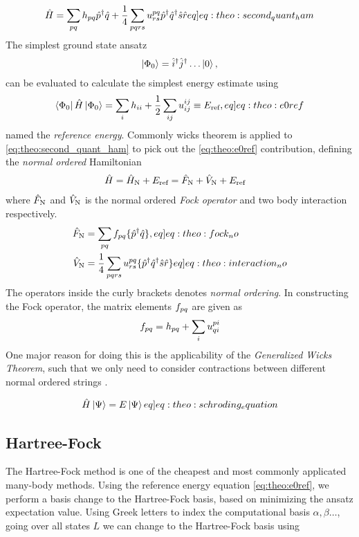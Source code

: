 \begin{align}
    \ham = \sum_{pq} \hshort{p}{q}\crt{p}\ani{q} + \frac{1}{4} \sum_{pqrs} \elmASshort{pq}{rs}\crt{p}\crt{q}\ani{s}\ani{r} \label[eq]{eq:theo:second_quant_ham}
\end{align}
The simplest ground state ansatz
\begin{align*}
    \ket{\Phi_0} = \hat{i}^{\dagger}\hat{j}^{\dagger}\ldots \ket{0},
\end{align*}
can be evaluated to calculate the simplest energy estimate using  \citep{molinariNotesWickTheorem2017} 
\begin{align}
    \braansatz \ham \ketansatz = \sum_{i} \hshort{i}{i} + \frac{1}{2}\sum_{ij} \elmASshort{ij}{ij} \equiv \Eref, \label[eq]{eq:theo:e0ref}
\end{align}
named the \textit{reference energy}. Commonly wicks theorem is applied to \cref{eq:theo:second_quant_ham} to pick out the \cref{eq:theo:e0ref} contribution, defining the \textit{normal ordered} Hamiltonian
\begin{align*}
    \hat{H} &= \hat{H}_\text{N} + E_{\text{ref}} = \hat{F}_\text{N} + \hat{V}_\text{N} + E_{\text{ref}}
\end{align*}
where $\hat{F}_\text{N}$ and $\hat{V}_\text{N}$ is the normal ordered \textit{Fock operator} and two body interaction respectively.
\begin{align}
    \fockno &= \sum_{pq} \fshort{p}{q} \set{\crt{p} \ani{q}}, \label[eq]{eq:theo:fock_no} \\
    \interno &= \frac{1}{4}\sum_{pqrs} \elmASshort{pq}{rs} \set{\crt{p}\crt{q}\ani{s}\ani{r}} \label[eq]{eq:theo:interaction_no}
\end{align}
The operators inside the curly brackets denotes \textit{normal ordering}. In constructing the Fock operator, the matrix elements $f_{pq}$ are given as 
\begin{align*}
    f_{pq} = h_{pq} + \sum_i u^{pi}_{qi}
\end{align*}
One major reason for doing this is the applicability of the \textit{Generalized Wicks Theorem}, such that we only need to consider contractions between different normal ordered strings \citep{ferialdiGeneralWickTheorem2021}.

\begin{align}
    \hat{H}\ket{\Psi} = E \ket{\Psi} \label[eq]{eq:theo:schroding_equation}
\end{align}

\subsection{Hartree-Fock}
The Hartree-Fock method is one of the cheapest and most commonly applicated many-body methods. Using the reference energy equation \cref{eq:theo:e0ref}, we perform a basis change to the Hartree-Fock basis, based on minimizing the ansatz expectation value. Using Greek letters to index the computational basis $\alpha, \beta \ldots$, going over all states $L$ we can change to the Hartree-Fock basis using

